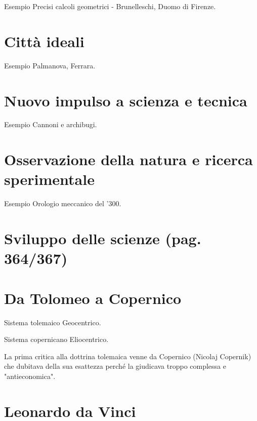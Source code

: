 \documentclass[12pt]{article}
\begin{document}
\begin{ex}{Esempio}
Precisi calcoli geometrici - Brunelleschi, Duomo di Firenze.
\end{ex}


\section{Città ideali}


\begin{ex}{Esempio}
Palmanova, Ferrara.
\end{ex}


\section{Nuovo impulso a scienza e tecnica}


\begin{ex}{Esempio}
Cannoni e archibugi.
\end{ex}


\section{Osservazione della natura e ricerca sperimentale}


\begin{ex}{Esempio}
Orologio meccanico del '300.
\end{ex}


\section{Sviluppo delle scienze (pag. 364/367)}


\section{Da Tolomeo a Copernico}


\begin{defn}{Sistema tolemaico}
Geocentrico.
\end{defn}


\begin{defn}{Sistema copernicano}
Eliocentrico.
\end{defn}


La prima critica alla dottrina tolemaica venne da Copernico (Nicolaj Copernik) che dubitava della sua esattezza perché la giudicava troppo complessa e "antieconomica".


\section{Leonardo da Vinci}
\end{document}
